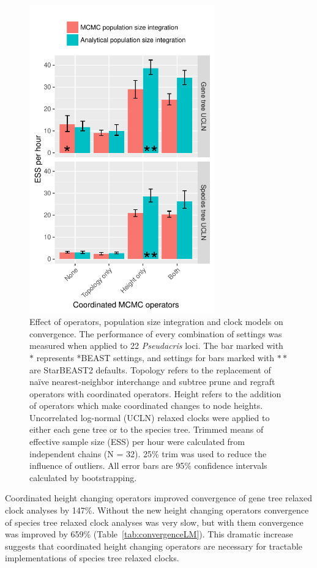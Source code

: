 \documentclass[nogrid]{MBE}%
\begin{document}
\begin{figure}[htb!]
\centering
\includegraphics[width=8cm]{minimum_ess_per_hour.pdf}
\caption
{Effect of operators, population size integration and clock models on
convergence. The performance of every combination of settings was measured when
applied to 22 \textit{Pseudacris} loci. The bar marked with $\ast$ represents
*BEAST settings, and settings for bars marked with $\ast\ast$ are StarBEAST2
defaults. Topology refers to the replacement of na\"ive nearest-neighbor
interchange and subtree prune and regraft operators with coordinated operators.
Height refers to the addition of operators which make coordinated changes to
node heights. Uncorrelated log-normal (UCLN) relaxed clocks were applied to
either each gene tree or to the species tree. Trimmed means of effective
sample size (ESS) per hour were calculated from independent chains (N = 32).
25\% trim was used to reduce the influence of outliers. All error bars are 95\%
confidence intervals calculated by bootstrapping.}
\label{fig:realEssPerHour}
\end{figure}

Coordinated height changing operators improved convergence of gene tree relaxed
clock analyses by 147\%. Without the new height changing operators convergence
of species tree relaxed clock analyses was very slow, but with them convergence
was improved by 659\% (Table~\ref{tab:convergenceLM}). This dramatic increase
suggests that coordinated height changing operators are necessary for tractable
implementations of species tree relaxed clocks.
\end{document}
